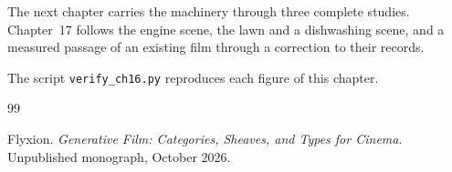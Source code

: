 \documentclass[11pt,twoside,openright]{book}
\theoremstyle{plain}
\theoremstyle{definition}
\theoremstyle{remark}
\begin{document}
The next chapter carries the machinery through three complete studies. Chapter~17 follows the engine scene, the lawn and a dishwashing scene, and a measured passage of an existing film through a correction to their records.

The script \texttt{verify\_ch16.py} reproduces each figure of this chapter.

\begin{thebibliography}{99}

Flyxion.
\newblock \emph{Generative Film: Categories, Sheaves, and Types for Cinema}.
\newblock Unpublished monograph, October 2026.

\end{thebibliography}
\end{document}
